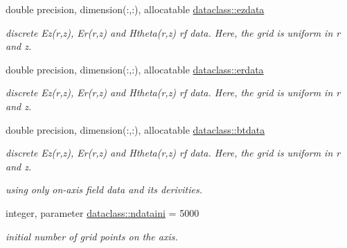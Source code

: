 \textbf{ }\par
\begin{DoxyCompactItemize}
\item 
double precision, dimension(\+:,\+:), allocatable \mbox{\hyperlink{namespacedataclass_a2f3f7950dbca31f394856d31781256f3}{dataclass\+::ezdata}}
\begin{DoxyCompactList}\small\item\em discrete Ez(r,z), Er(r,z) and Htheta(r,z) rf data. Here, the grid is uniform in r and z. \end{DoxyCompactList}\item 
double precision, dimension(\+:,\+:), allocatable \mbox{\hyperlink{namespacedataclass_a4f3abc6db52a89363b184d4bec9ebff8}{dataclass\+::erdata}}
\begin{DoxyCompactList}\small\item\em discrete Ez(r,z), Er(r,z) and Htheta(r,z) rf data. Here, the grid is uniform in r and z. \end{DoxyCompactList}\item 
double precision, dimension(\+:,\+:), allocatable \mbox{\hyperlink{namespacedataclass_a09d27eeab42c3e3369268d8ce133a2c0}{dataclass\+::btdata}}
\begin{DoxyCompactList}\small\item\em discrete Ez(r,z), Er(r,z) and Htheta(r,z) rf data. Here, the grid is uniform in r and z. \end{DoxyCompactList}\end{DoxyCompactItemize}

\textbf{ }\par
{\em using only on-\/axis field data and its derivities. }\begin{DoxyCompactItemize}
\item 
integer, parameter \mbox{\hyperlink{namespacedataclass_a2578bbe9c4dc0892ee08a8619cd7e978}{dataclass\+::ndataini}} = 5000
\begin{DoxyCompactList}\small\item\em initial number of grid points on the axis. \end{DoxyCompactList}\end{DoxyCompactItemize}

